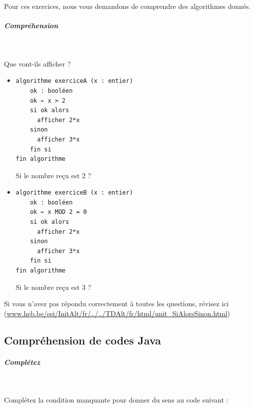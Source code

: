 \documentclass[11pt,a4paper]{article}
\begin{document}
          Pour ces exercices, nous vous demandons de comprendre des algorithmes donn\'es. 
        
            \par
        
			
		\subparagraph{Compr\'ehension} 
		
                \textcolor{white}{.} \par
            
							  Que vont-ils afficher ?
              
					\begin{itemize}
				
			\item \begin{verbatim}
algorithme exerciceA (x : entier)
    ok : booléen
    ok ← x > 2
    si ok alors
      afficher 2*x
    sinon
      afficher 3*x
    fin si
fin algorithme
				\end{verbatim}Si le nombre re\c cu est 2 ? 
            \par
         \textcolor{gray}{\underline{\hspace*{1em}}} 
			\item \begin{verbatim}
algorithme exerciceB (x : entier)
    ok : booléen
    ok ← x MOD 2 = 0
    si ok alors
      afficher 2*x
    sinon
      afficher 3*x
    fin si
fin algorithme
				\end{verbatim}Si le nombre re\c cu est 3 ? 
            \par
         \textcolor{gray}{\underline{\hspace*{1em}}} 
					\end{itemize}
				Si vous n'avez pas r\'epondu correctement \`a toutes les questions, 
        r\'evisez ici (\url{www.heb.be/esi/InitAlt/fr/../../TDAlt/fr/html/unit\_SiAlorsSinon.html})
            \par
        \subsection{Compr\'ehension de codes Java}
			
		\subparagraph{Compl\'etez} 
		
                \textcolor{white}{.} \par
            
								Compl\'etez la condition manquante pour donner du sens au code suivant :
							
            \par
			
\end{document}

